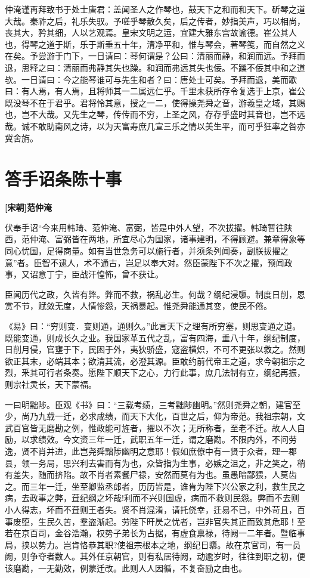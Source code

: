 \documentclass[UTF8,titlepage,oneside]{ctexbook}
\begin{document}
仲淹谨再拜致书于处士唐君：盖闻圣人之作琴也，鼓天下之和而和天下。斫琴之道大哉。秦祚之后，礼乐失驭。予嗟乎琴散久矣，后之传者，妙指美声，巧以相尚，丧其大，矜其细，人以艺观焉。皇宋文明之运，宜建大雅东宫故谕德。崔公其人也，得琴之道于斯，乐于斯垂五十年，清净平和，惟与琴会，著琴笺，而自然之义在矣。予尝游于门下，一日请曰：琴何谓是？公曰：清丽而静，和润而远。予拜而退，思释之曰：清丽而弗静其失也躁。和润而弗远其失也佞。不躁不佞其中和之道欤。一日请曰：今之能琴谁可与先生和者？曰：唐处士可矣。予拜而退，美而歌曰：有人焉，有人焉，且将师其一二属远仁乎。千里未获所存令复选于上京，崔公既没琴不在于君乎。君将怜其意，授之一二，使得操尧舜之音，游羲皇之域，其赐也，岂不大哉。又先生之琴，传传而不穷，上圣之风，存存乎盛时其音也，岂不远哉。诚不敢助南风之诗，以为天富寿庶几宣三乐之情以美生平，而可乎狂率之咎亦冀舍旃。



\chapter*{答手诏条陈十事}
\begin{center}
	\textbf{[宋朝]范仲淹}
\end{center}

伏奉手诏“今来用韩琦、范仲淹、富弼，皆是中外人望，不次拔擢。韩琦暂往陕西，范仲淹、富弼皆在两地，所宜尽心为国家，诸事建明，不得顾避。兼章得象等同心忧国，足得商量。如有当世急务可以施行者，并须条列闻奏，副朕拔擢之意”者。臣智不逮人，术不通古，岂足以奉大对。然臣蒙陛下不次之擢，预闻政事，又诏意丁宁，臣战汗惶怖，曾不获让。


臣闻历代之政，久皆有弊。弊而不救，祸乱必生。何哉？纲纪浸隳。制度日削，恩赏不节，赋敛无度，人情惨怨，天祸暴起。惟尧舜能通其变，使民不倦。


《易》曰：“穷则变．变则通，通则久。”此言天下之理有所穷塞，则思变通之道。既能变通，则成长久之业。我国家革五代之乱，富有四海，垂八十年，纲纪制度，日削月侵，官壅于下，民困于外，夷狄骄盛，寇盗横炽，不可不更张以救之。然则欲正其末，必端其本；欲清其流，必澄其源。臣敢约前代帝王之道，求今朝祖宗之烈，釆其可行者条奏。愿陛下顺天下之心，力行此事，庶几法制有立，纲纪再振，则宗社灵长，天下蒙福。


一曰明黜陟。臣观《书》曰：“三载考绩，三考黜陟幽明。”然则尧舜之朝，建官至少，尚乃九载一迁，必求成绩，而天下大化，百世之后，仰为帝范。我祖宗朝，文武百官皆无磨勘之例，惟政能可旌者，擢以不次；无所称者，至老不迁。故人人自励，以求绩效。今文资三年一迁，武职五年一迁，谓之磨勘。不限内外，不问劳逸，贤不肖并进，此岂尧舜黜陟幽明之意耶！假如庶僚中有一贤于众者，理一郡县，领一务局，思兴利去害而有为也，众皆指为生事，必嫉之沮之，非之笑之，稍有差失，随而挤陷。故不肖者素餐尸禄，安然而莫有为也。虽愚暗鄙猥，人莫齿之。而三年一迁，坐至卿监丞郎者，历历皆是，谁肯为陛下兴公家之利，救生民之病，去政事之弊，葺纪纲之坏哉!利而不兴则国虚，病而不救则民怨。弊而不去则小人得志，坏而不葺则王者失。贤不肖混淆，请托侥幸，迁易不已，中外苛且，百事废堕，生民久苦，羣盗渐起。劳陛下旰昃之忧者，岂非官失其正而致其危耶！至若在京百司，金谷浩瀚，权势子弟长为占据，有虚食禀禄，待阙一二年者。暨临事局，挟以势力。岂肯恪恭其职?使祖宗根本之地，纲纪日隳。故在京官司，有一员阙，则争夺者数人。其外任京朝官，则有私居待阙，动逾岁时，往往到职之初，便该磨勘，一无勤效，例蒙迁改。此则人人因循，不复奋励之由也。
\end{document}
